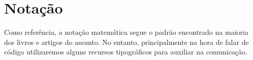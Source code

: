 \chapter*{Notação}
   Como referência, a notação matemática segue o padrão encontrado na maioria dos livros e artigos do assunto. No entanto, principalmente na hora de falar de código utilizaremos alguns recursos tipográficos para auxiliar na comunicação. \par